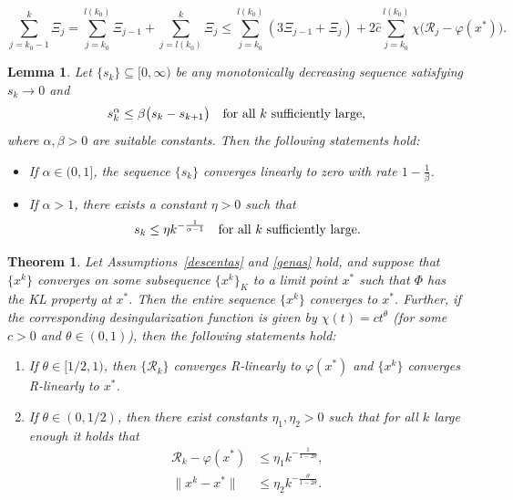 \documentclass[10pt,a4paper]{amsart}
\newtheorem{theorem}{Theorem}
\newtheorem{lemma}{Lemma}
\newcommand{\Rvalue}{\mathcal{R}}
\newcommand{\xk}{x^k}
\begin{document}
\begin{equation}\label{eq:sumXis}
	\sum_{j=k_0-1}^k \Xi_j = \sum_{j=k_0}^{l(k_0)} \Xi_{j-1} + \sum_{j=l(k_0)}^k \Xi_j \leq \sum_{j=k_0}^{l(k_0)} (3 \Xi_{j-1} + \Xi_j) + 2 \hat c \sum_{j = k_0}^{l(k_0)}\chi \big( \Rvalue_j - \varphi(x^*) \big).
\end{equation}

\begin{lemma}\label{Lem:Aragon}
Let $ \{ s_k \} \subseteq [0, \infty )$ be any monotonically decreasing sequence satisfying $ s_k \to 0 $ and 
\begin{equation*}
	s_k^\alpha \leq \beta \big( s_k - s_{k+1} \big) \quad
	\text{for all $ k $ sufficiently large},
\end{equation*}
where $ \alpha, \beta > 0 $ are suitable constants. Then the following
statements hold:
\begin{itemize}
	\item[(a)] If $ \alpha \in (0,1] $, the sequence $ \{ s_k \} $
	converges linearly to zero with rate $ 1 - \frac{1}{\beta} $.
	\item[(b)] If $ \alpha > 1 $, there exists a constant $ \eta > 0 $
	such that 
	\begin{equation*}
		s_k \leq \eta k^{- \frac{1}{\alpha - 1}} \quad
		\text{for all $ k $ sufficiently large}.
	\end{equation*}
\end{itemize}
\end{lemma}

\begin{theorem}\label{thm:convergencerateproof}
Let Assumptions~\ref{descentas} and \ref{genas} hold, and suppose that $\{ \xk \}$ converges on some subsequence $\{ \xk\}_K$ to a limit point $x^*$ such that $\Phi$ has the KL property at $x^*$. Then the entire sequence $\{ \xk \}$ converges to $x^*$. Further, if the corresponding desingularization function is given by $\chi(t) = ct^{\theta}$ (for some $c>0$ and $\theta \in (0,1)$), then the following statements hold:
\begin{enumerate}[label=(\alph*)]
	\item If $\theta \in [1/2, 1)$, then $\{\Rvalue_k\}$ converges R-linearly to $\varphi(x^*)$ and $\{\xk\}$ converges R-linearly to $x^*$. \label{itm1}
	\item If $\theta \in (0, 1/2)$, then there exist constants $\eta_1, \eta_2 > 0$ such that for all $k$ large enough it holds that\label{itm2}
	\begin{align}
		\Rvalue_k - \varphi(x^*) &\leq \eta_1 k^{-\frac{1}{1-2\theta}},\\
		\|\xk - x^*\| &\leq \eta_2 k^{-\frac{\theta}{1-2\theta}}.
	\end{align}
\end{enumerate}
\end{theorem}
\end{document}

